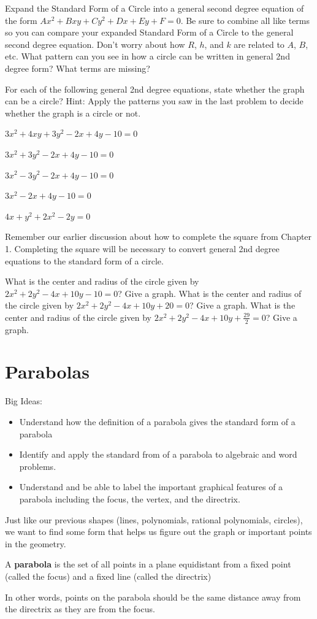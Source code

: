 \bq Expand the Standard Form of a Circle into a general second degree equation of the form $Ax^2+Bxy+Cy^2+Dx+Ey+F=0$. Be sure to combine all like terms so you can compare your expanded Standard Form of a Circle to the general second degree equation. Don't worry about how $R$, $h$, and $k$ are related to $A$, $B$, etc. What pattern can you see in how a circle can be written in general 2nd degree form? What terms are missing?
\eq

\bq For each of the following general 2nd degree equations, state whether the graph can be a circle? Hint: Apply the patterns you saw in the last problem to decide whether the graph is a circle or not.
\be
\item $3x^2+4xy+3y^2-2x+4y-10=0$
\item $3x^2+3y^2-2x+4y-10=0$
\item $3x^2-3y^2-2x+4y-10=0$
\item $3x^2-2x+4y-10=0$
\item $4x+y^2+2x^2-2y=0$
\ee
\eq

Remember our earlier discussion about how to complete the square from Chapter 1. Completing the square will be necessary to convert general 2nd degree equations to the standard form of a circle.

\bq What is the center and radius of the circle given by $2x^2+2y^2-4x+10y-10=0$? Give a graph.
\eq
\bq What is the center and radius of the circle given by $2x^2+2y^2-4x+10y+20=0$? Give a graph.
\eq
\bq What is the center and radius of the circle given by $2x^2+2y^2-4x+10y+\frac{29}{2}=0$? Give a graph.
\eq
\section{Parabolas}
Big Ideas:
\begin{itemize}
\item Understand how the definition of a parabola gives the standard form of a parabola
\item Identify and apply the standard from of a parabola to algebraic and word problems.
\item Understand and be able to label the important graphical features of a parabola including the focus, the vertex, and the directrix.
\end{itemize}
Just like our previous shapes (lines, polynomials, rational polynomials, circles), we want to find some form that helps us figure out the graph or important points in the geometry.
\begin{info}
A \textbf{parabola} is the set of all points in a plane equidistant from a fixed point (called the focus)  and a fixed line (called the directrix)

In other words, points on the parabola should be the same distance away from the directrix as they are from the focus.
\end{info}

